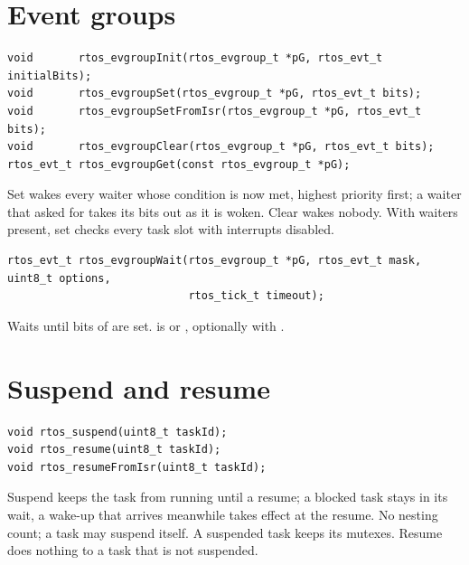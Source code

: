 \section{Event groups}

\begin{lstlisting}
void       rtos_evgroupInit(rtos_evgroup_t *pG, rtos_evt_t initialBits);
void       rtos_evgroupSet(rtos_evgroup_t *pG, rtos_evt_t bits);
void       rtos_evgroupSetFromIsr(rtos_evgroup_t *pG, rtos_evt_t bits);
void       rtos_evgroupClear(rtos_evgroup_t *pG, rtos_evt_t bits);
rtos_evt_t rtos_evgroupGet(const rtos_evgroup_t *pG);
\end{lstlisting}
Set wakes every waiter whose condition is now met, highest priority first; a waiter that
asked for  takes its bits out as it is woken. Clear wakes nobody.
With waiters present, set checks every task slot with interrupts disabled.

\begin{lstlisting}
rtos_evt_t rtos_evgroupWait(rtos_evgroup_t *pG, rtos_evt_t mask, uint8_t options,
                            rtos_tick_t timeout);
\end{lstlisting}
Waits until bits of  are set.  is  or
, optionally with .

\section{Suspend and resume}

\begin{lstlisting}
void rtos_suspend(uint8_t taskId);
void rtos_resume(uint8_t taskId);
void rtos_resumeFromIsr(uint8_t taskId);
\end{lstlisting}
Suspend keeps the task from running until a resume; a blocked task stays in its wait, a
wake-up that arrives meanwhile takes effect at the resume. No nesting count; a task may
suspend itself. A suspended task keeps its mutexes. Resume does nothing to a task that is
not suspended.


